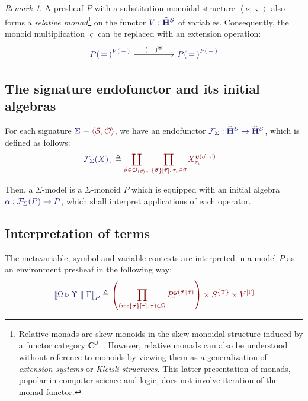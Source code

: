 \documentclass[11pt]{article}
\theoremstyle{definition}
\theoremstyle{remark}
\newtheorem{remark}[thm]{Remark}
\numberwithin{equation}{section}
\def\IModeColorName{MidnightBlue}
\def\OModeColorName{Maroon}
\newcommand\IMode[1]{{\color{\IModeColorName}{#1}}}
\newcommand\OMode[1]{{\color{\OModeColorName}{#1}}}
\newcommand\Of[2]{\IMode{#1}: \IMode{#2}}
\newcommand\MkValence[3]{%
  \ifthenelse{\equal{#1}{}}{}{%
    \{#1\}%
  }%
  \ifthenelse{\equal{#2}{}}{}{%
    [#2]%
  }.\, #3%
}
\newcommand\MkArity[2]{(#1)\, #2}
\newcommand\Match[2]{\IMode{#1}\equiv\OMode{#2}}
\newcommand\Sorts{\mathcal{S}}
\newcommand\Operators{\mathcal{O}}
\newcommand\HypCat{\mathbf{H}}
\newcommand\Pair[2]{\left\langle#1, #2 \right\rangle}
\newcommand\Define[2]{\IMode{#1}\triangleq\OMode{#2}}
\newcommand\SigFun[1]{\mathcal{F}_{#1}}
\newcommand\SemBrackets[1]{\left\llbracket#1\right\rrbracket}
\newcommand\Yoneda[1]{\boldsymbol{y} (#1)}
\begin{document}
\begin{remark}
  A presheaf $P$ with a substitution monoidal structure $\Pair{\nu}{\varsigma}$
  also forms a \emph{relative monad}\footnote{Relative monads are skew-monoids
    in the skew-monoidal structure induced by a functor category
    $\mathbf{C}^\mathbf{J}$~\cite{altenkirch-chapman-uustalu:2015}. However,
    relative monads can also be understood without reference to monoids by
    viewing them as a generalization of \emph{extension systems} or
    \emph{Kleisli structures}. This latter presentation of monads, popular in
    computer science and logic, does not involve iteration of the monad
    functor.} on the functor $\Of{V}{\widehat{\HypCat}^\Sorts}$ of variables.
  Consequently, the monoid multiplication $\varsigma$ can be replaced with an
  extension operation:
  \[
    \begin{tikzcd}[ampersand replacement = \&, sep = huge]
      {\IMode{{P(\,=\,)}^{V(\,-\,)}}} \arrow[r, "{(\,-\,)}^{\circledast}"]
      \& {\IMode{{P(\,=\,)}^{P(\,-\,)}}}
    \end{tikzcd}
  \]
\end{remark}

\subsection{The signature endofunctor and its initial algebras}

For each signature $\Match{\Sigma}{\Pair{\Sorts}{\Operators}}$, we have an
endofunctor
$\Of{\SigFun{\Sigma}}{\widehat{\HypCat}^\Sorts\to\widehat{\HypCat}^\Sorts}$,
which is defined as follows:
\begin{align*}
  \IMode{{\SigFun{\Sigma}(X)}_{\tau}}
    &\triangleq
    \OMode{
      \coprod_{\vartheta\in \Operators_{\MkArity{\vec{v}}{\tau}}}
      \prod_{\MkValence{\vec{\sigma}}{\vec{\tau}}{\tau_i}\in\vec{v}}
      X_{\tau_i}^{\Yoneda{\vec{\sigma}\parallel\vec{\tau}}}
    }
\end{align*}

Then, a $\Sigma$-model is a $\Sigma$-monoid $P$ which is equipped with an initial
algebra $\Of{\alpha}{\SigFun{\Sigma}(P)\to P}$, which shall interpret
applications of each operator.

\subsection{Interpretation of terms}

The metavariable, symbol and variable contexts are interpreted in a model $P$ as an
environment presheaf in the following way:
\[
  \Define{
    \SemBrackets{
      \Omega\triangleright\Upsilon\parallel\Gamma
    }_P
  }{
    \left(\prod_{(m:\MkValence{\vec{\sigma}}{\vec{\tau}}{\tau})\in\Omega}P_{\tau}^{\Yoneda{\vec{\sigma}\parallel\vec{\tau}}}\right)
    \times
    S^{\{\Upsilon\}}
    \times
    V^{[\Gamma]}
  }
\]
\end{document}
